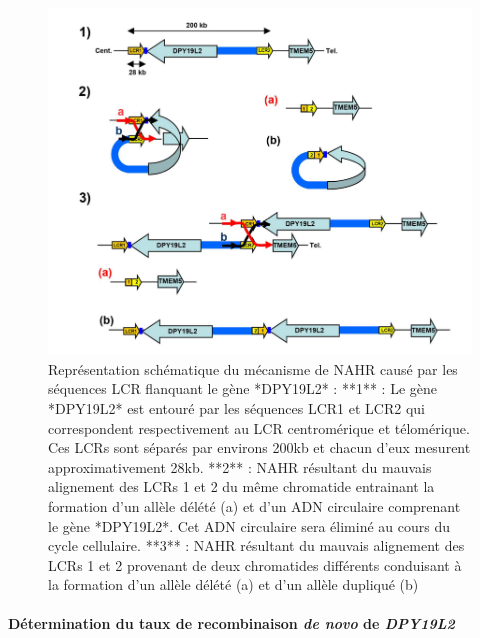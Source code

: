 \documentclass[12pt,twoside]{reedthesis}
\theoremstyle{definition}
\theoremstyle{definition}
\theoremstyle{remark}
\begin{document}
  \begin{figure}
  
  {\centering \includegraphics[scale=0.5]{figure/dpy_nahr} 
  
  }
  
  \caption[Représentation schématique du mécanisme de NAHR causé par les séquences LCR flanquant le gène *DPY19L2*]{Représentation schématique du mécanisme de NAHR causé par les séquences LCR flanquant le gène *DPY19L2* : **1** : Le gène *DPY19L2* est entouré par les séquences LCR1 et LCR2 qui correspondent respectivement au LCR centromérique et télomérique. Ces LCRs sont séparés par environs 200kb et chacun d'eux mesurent approximativement 28kb. **2** : NAHR résultant du mauvais alignement des LCRs 1 et 2 du même chromatide entrainant la formation d'un allèle délété (a) et d'un ADN circulaire comprenant le gène *DPY19L2*. Cet ADN circulaire sera éliminé au cours du cycle cellulaire. **3** : NAHR résultant du mauvais alignement des LCRs 1 et 2 provenant de deux chromatides différents conduisant à la formation d'un allèle délété (a) et d'un allèle dupliqué (b)}\label{fig:nahr}
  \end{figure}
  
  \paragraph{\texorpdfstring{Détermination du taux de recombinaison
  \emph{de novo} de
  \emph{DPY19L2}}{Détermination du taux de recombinaison de novo de DPY19L2}}\label{determination-du-taux-de-recombinaison-de-novo-de-dpy19l2}
  
\end{document}
